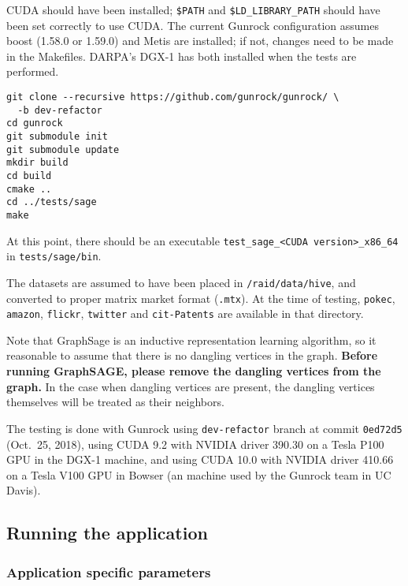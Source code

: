\documentclass[10pt,oneside]{memoir}
\begin{document}
CUDA should have been installed; \texttt{\$PATH} and
\texttt{\$LD\_LIBRARY\_PATH} should have been set correctly to use CUDA.
The current Gunrock configuration assumes boost (1.58.0 or 1.59.0) and
Metis are installed; if not, changes need to be made in the Makefiles.
DARPA's DGX-1 has both installed when the tests are performed.

\begin{verbatim}
git clone --recursive https://github.com/gunrock/gunrock/ \
  -b dev-refactor
cd gunrock
git submodule init
git submodule update
mkdir build
cd build
cmake ..
cd ../tests/sage
make
\end{verbatim}

At this point, there should be an executable
\texttt{test\_sage\_\textless{}CUDA\ version\textgreater{}\_x86\_64} in
\texttt{tests/sage/bin}.

The datasets are assumed to have been placed in
\texttt{/raid/data/hive}, and converted to proper matrix market format
(\texttt{.mtx}). At the time of testing, \texttt{pokec},
\texttt{amazon}, \texttt{flickr}, \texttt{twitter} and
\texttt{cit-Patents} are available in that directory.

Note that GraphSage is an inductive representation learning algorithm,
so it reasonable to assume that there is no dangling vertices in the
graph. \textbf{Before running GraphSAGE, please remove the dangling
vertices from the graph.} In the case when dangling vertices are
present, the dangling vertices themselves will be treated as their
neighbors.

The testing is done with Gunrock using \texttt{dev-refactor} branch at
commit \texttt{0ed72d5} (Oct.~25, 2018), using CUDA 9.2 with NVIDIA
driver 390.30 on a Tesla P100 GPU in the DGX-1 machine, and using CUDA
10.0 with NVIDIA driver 410.66 on a Tesla V100 GPU in Bowser (an machine
used by the Gunrock team in UC Davis).

\hypertarget{running-the-application-2}{%
\subsection{Running the application}\label{running-the-application-2}}

\hypertarget{application-specific-parameters}{%
\subsubsection{Application specific
parameters}\label{application-specific-parameters}}
\end{document}
